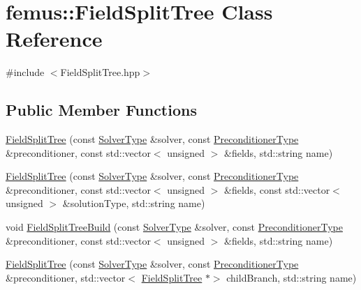 \hypertarget{classfemus_1_1_field_split_tree}{}\section{femus\+:\+:Field\+Split\+Tree Class Reference}
\label{classfemus_1_1_field_split_tree}


{\ttfamily \#include $<$Field\+Split\+Tree.\+hpp$>$}

\subsection*{Public Member Functions}
\begin{DoxyCompactItemize}
\item 
\mbox{\hyperlink{classfemus_1_1_field_split_tree_a37f4e60aca7cd9a089c1c3f383aab68e}{Field\+Split\+Tree}} (const \mbox{\hyperlink{_solvertype_enum_8hpp_a8b06041d7c1fb05f379714f4312306ec}{Solver\+Type}} \&solver, const \mbox{\hyperlink{_precondtype_enum_8hpp_a8b341faac6531c4543c9dc6e5e4592cf}{Preconditioner\+Type}} \&preconditioner, const std\+::vector$<$ unsigned $>$ \&fields, std\+::string name)
\item 
\mbox{\hyperlink{classfemus_1_1_field_split_tree_a05e2a386ed200db5d1461f2c328f7935}{Field\+Split\+Tree}} (const \mbox{\hyperlink{_solvertype_enum_8hpp_a8b06041d7c1fb05f379714f4312306ec}{Solver\+Type}} \&solver, const \mbox{\hyperlink{_precondtype_enum_8hpp_a8b341faac6531c4543c9dc6e5e4592cf}{Preconditioner\+Type}} \&preconditioner, const std\+::vector$<$ unsigned $>$ \&fields, const std\+::vector$<$ unsigned $>$ \&solution\+Type, std\+::string name)
\item 
void \mbox{\hyperlink{classfemus_1_1_field_split_tree_a91c00577aaea85a0c13da54a6e0827a2}{Field\+Split\+Tree\+Build}} (const \mbox{\hyperlink{_solvertype_enum_8hpp_a8b06041d7c1fb05f379714f4312306ec}{Solver\+Type}} \&solver, const \mbox{\hyperlink{_precondtype_enum_8hpp_a8b341faac6531c4543c9dc6e5e4592cf}{Preconditioner\+Type}} \&preconditioner, const std\+::vector$<$ unsigned $>$ \&fields, std\+::string name)
\item 
\mbox{\hyperlink{classfemus_1_1_field_split_tree_a18a340ff86de25fcaa99a9e5d02b41c7}{Field\+Split\+Tree}} (const \mbox{\hyperlink{_solvertype_enum_8hpp_a8b06041d7c1fb05f379714f4312306ec}{Solver\+Type}} \&solver, const \mbox{\hyperlink{_precondtype_enum_8hpp_a8b341faac6531c4543c9dc6e5e4592cf}{Preconditioner\+Type}} \&preconditioner, std\+::vector$<$ \mbox{\hyperlink{classfemus_1_1_field_split_tree}{Field\+Split\+Tree}} $\ast$$>$ child\+Branch, std\+::string name)
$$
\end{DoxyCompactItemize}
